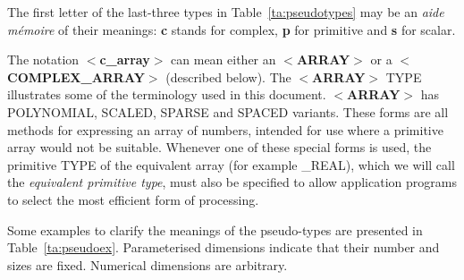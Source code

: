 The first letter of the last-three types in Table~\ref{ta:pseudotypes}
may be an {\it aide m\'{e}moire} of their meanings: {\bf c} stands for
complex, {\bf p} for primitive and {\bf s} for scalar.

The notation $<${\bf c\_array}$>$ can mean either an $<${\bf ARRAY}$>$ or a
$<${\bf COMPLEX\_ARRAY}$>$ (described below). The \mbox{$<${\bf ARRAY}$>$} TYPE
illustrates some of the terminology used in this document.
\mbox{$<${\bf ARRAY}$>$} has
POLYNOMIAL, SCALED, SPARSE and SPACED variants.
These forms are all methods for expressing an array of numbers, intended
for use where a primitive array
would not be suitable.  Whenever one of
these special forms is used, the primitive TYPE of the
equivalent array (for example \_REAL), which we will call the
{\it equivalent primitive type}, must also
be specified to allow application programs to select the
most efficient form of processing.

Some examples to clarify the meanings of the pseudo-types are presented
in Table~\ref{ta:pseudoex}.
Parameterised dimensions indicate that their number and sizes are
fixed. Numerical dimensions are arbitrary.

